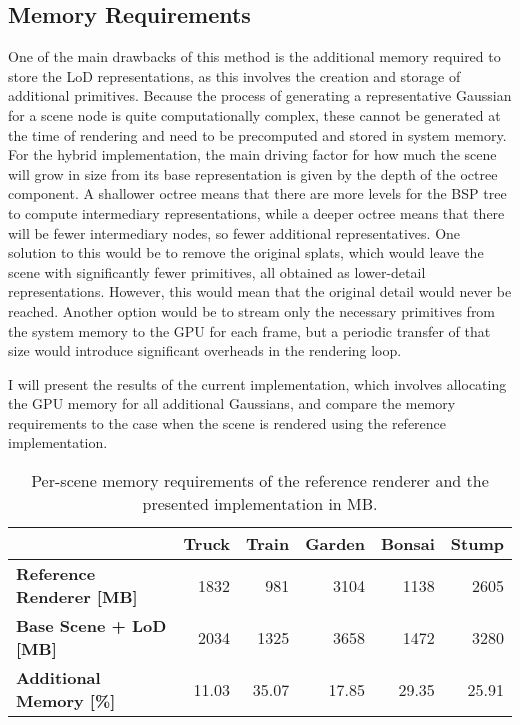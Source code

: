 \subsection{Memory Requirements}
One of the main drawbacks of this method is the additional memory required to store the LoD representations, as this involves the creation and storage of additional primitives. Because the process of generating a representative Gaussian for a scene node is quite computationally complex, these cannot be generated at the time of rendering and need to be precomputed and stored in system memory. For the hybrid implementation, the main driving factor for how much the scene will grow in size from its base representation is given by the depth of the octree component. A shallower octree means that there are more levels for the BSP tree to compute intermediary representations, while a deeper octree means that there will be fewer intermediary nodes, so fewer additional representatives. One solution to this would be to remove the original splats, which would leave the scene with significantly fewer primitives, all obtained as lower-detail representations. However, this would mean that the original detail would never be reached. Another option would be to stream only the necessary primitives from the system memory to the GPU for each frame, but a periodic transfer of that size would introduce significant overheads in the rendering loop. 

I will present the results of the current implementation, which involves allocating the GPU memory for all additional Gaussians, and compare the memory requirements to the case when the scene is rendered using the reference implementation. 

\begin{table}[H]
\centering
\begin{tabular}{ll|l|l|l|l}
                                     & \textbf{Truck}             & \textbf{Train}             & \textbf{Garden}            & \textbf{Bonsai}            & \textbf{Stump}            \\ \hline
\textbf{Reference Renderer {[}MB{]}} & \multicolumn{1}{r|}{1832}  & \multicolumn{1}{r|}{981}   & \multicolumn{1}{r|}{3104}  & \multicolumn{1}{r|}{1138}  & \multicolumn{1}{r}{2605}  \\
\textbf{Base Scene + LoD {[}MB{]}}   & \multicolumn{1}{r|}{2034}  & \multicolumn{1}{r|}{1325}  & \multicolumn{1}{r|}{3658}  & \multicolumn{1}{r|}{1472}  & \multicolumn{1}{r}{3280}  \\ \hline
\textbf{Additional Memory {[}\%{]}}  & \multicolumn{1}{r|}{11.03} & \multicolumn{1}{r|}{35.07} & \multicolumn{1}{r|}{17.85} & \multicolumn{1}{r|}{29.35} & \multicolumn{1}{r}{25.91} \\                        
\end{tabular}
\caption{Per-scene memory requirements of the reference renderer and the presented implementation in MB.}
\label{tab:memory}
\end{table}

